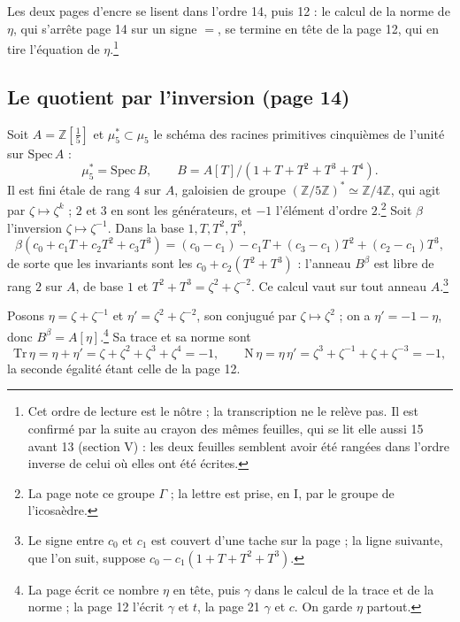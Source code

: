 \documentclass[11pt,a4paper]{article}
\begin{document}
Les deux pages d'encre se lisent dans l'ordre 14, puis 12 : le calcul de la
norme de $\eta$, qui s'arrête page 14 sur un signe $=$, se termine en tête de
la page 12, qui en tire l'équation de $\eta$.\footnote{Cet ordre de lecture
est le nôtre ; la transcription ne le relève pas. Il est confirmé par la
suite au crayon des mêmes feuilles, qui se lit elle aussi 15 avant 13
(section V) : les deux feuilles semblent avoir été rangées dans l'ordre
inverse de celui où elles ont été écrites.}

\subsection*{Le quotient par l'inversion (page 14)}

Soit $A = \mathbb{Z}[\frac15]$ et $\mu_5^{*} \subset \mu_5$ le schéma des
racines primitives cinquièmes de l'unité sur $\mathrm{Spec}\,A$ :
\[
\mu_5^{*} = \mathrm{Spec}\,B,\qquad B = A[T]/(1 + T + T^{2} + T^{3} + T^{4}).
\]
Il est fini étale de rang $4$ sur $A$, galoisien de groupe
$(\mathbb{Z}/5\mathbb{Z})^{*} \simeq \mathbb{Z}/4\mathbb{Z}$, qui agit par
$\zeta \mapsto \zeta^{k}$ ; $2$ et $3$ en sont les générateurs, et $-1$
l'élément d'ordre $2$.\footnote{La page note ce groupe $\Gamma$ ; la lettre
est prise, en I, par le groupe de l'icosaèdre.} Soit $\beta$ l'inversion
$\zeta \mapsto \zeta^{-1}$. Dans la base $1, T, T^{2}, T^{3}$,
\[
\beta(c_0 + c_1T + c_2T^{2} + c_3T^{3}) = (c_0 - c_1) - c_1T + (c_3 - c_1)T^{2} + (c_2 - c_1)T^{3},
\]
de sorte que les invariants sont les $c_0 + c_2(T^{2} + T^{3})$ : l'anneau
$B^{\beta}$ est libre de rang $2$ sur $A$, de base $1$ et
$T^{2} + T^{3} = \zeta^{2} + \zeta^{-2}$. Ce calcul vaut sur tout anneau
$A$.\footnote{Le signe entre $c_0$ et $c_1$ est couvert d'une tache sur la
page ; la ligne suivante, que l'on suit, suppose
$c_0 - c_1(1 + T + T^{2} + T^{3})$.}

Posons $\eta = \zeta + \zeta^{-1}$ et $\eta' = \zeta^{2} + \zeta^{-2}$, son
conjugué par $\zeta \mapsto \zeta^{2}$ ; on a $\eta' = -1 - \eta$, donc
$B^{\beta} = A[\eta]$.\footnote{La page écrit ce nombre $\eta$ en tête, puis
$\gamma$ dans le calcul de la trace et de la norme ; la page 12 l'écrit
$\gamma$ et $t$, la page 21 $\gamma$ et $c$. On garde $\eta$ partout.} Sa
trace et sa norme sont
\[
\mathrm{Tr}\,\eta = \eta + \eta' = \zeta + \zeta^{2} + \zeta^{3} + \zeta^{4} = -1,
\qquad
\mathrm{N}\,\eta = \eta\,\eta' = \zeta^{3} + \zeta^{-1} + \zeta + \zeta^{-3} = -1,
\]
la seconde égalité étant celle de la page 12.
\end{document}
